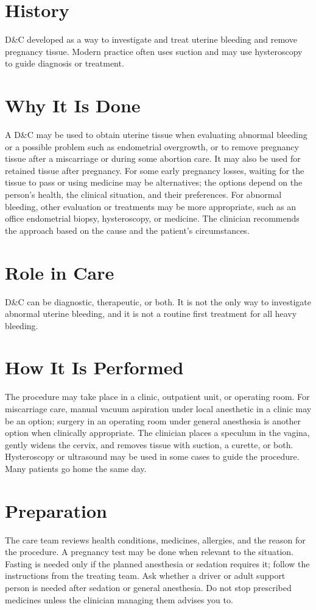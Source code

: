 \section*{History}
D\&C developed as a way to investigate and treat uterine bleeding and remove pregnancy tissue. Modern practice often uses suction and may use hysteroscopy to guide diagnosis or treatment.

\section*{Why It Is Done}
A D\&C may be used to obtain uterine tissue when evaluating abnormal bleeding or a possible problem such as endometrial overgrowth, or to remove pregnancy tissue after a miscarriage or during some abortion care. It may also be used for retained tissue after pregnancy. For some early pregnancy losses, waiting for the tissue to pass or using medicine may be alternatives; the options depend on the person's health, the clinical situation, and their preferences. For abnormal bleeding, other evaluation or treatments may be more appropriate, such as an office endometrial biopsy, hysteroscopy, or medicine. The clinician recommends the approach based on the cause and the patient's circumstances.

\section*{Role in Care}
D\&C can be diagnostic, therapeutic, or both. It is not the only way to investigate abnormal uterine bleeding, and it is not a routine first treatment for all heavy bleeding.

\section*{How It Is Performed}
The procedure may take place in a clinic, outpatient unit, or operating room. For miscarriage care, manual vacuum aspiration under local anesthetic in a clinic may be an option; surgery in an operating room under general anesthesia is another option when clinically appropriate. The clinician places a speculum in the vagina, gently widens the cervix, and removes tissue with suction, a curette, or both. Hysteroscopy or ultrasound may be used in some cases to guide the procedure. Many patients go home the same day.

\section*{Preparation}
The care team reviews health conditions, medicines, allergies, and the reason for the procedure. A pregnancy test may be done when relevant to the situation. Fasting is needed only if the planned anesthesia or sedation requires it; follow the instructions from the treating team. Ask whether a driver or adult support person is needed after sedation or general anesthesia. Do not stop prescribed medicines unless the clinician managing them advises you to.

